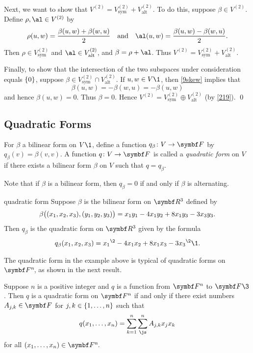 Next, we want to show that $V^{(2)} = V^{(2)}_{\text{sym}} + V^{(2)}_{\text{alt}}$. To do this, suppose $\beta \in V^{(2)}\!$. Define
$\rho, \al \in V^{(2)}$ by
\[
\rho(u,w) = \frac{ \beta(u,w) + \beta(w,u) }{2} \andd \al(u,w) = \frac{ \beta(u,w) - \beta(w,u) }{2}.
\]
Then $\rho \in V^{(2)}_{\text{sym}}$ and $\al \in V^{(2)}_{\text{alt}}$, and $\beta = \rho + \al$. Thus
$V^{(2)} = V^{(2)}_{\text{sym}} + V^{(2)}_{\text{alt}}$.

Finally, to show that the intersection of the two subspaces under consideration equals $\br{0}$, suppose
$\beta \in V^{(2)}_{\text{sym}} \cap V^{(2)}_{\text{alt}}$. If  $u, w \in V\1$, then \ref{9skew} implies that
\[
\beta(u,w) = -\beta(w, u) = -\beta(u,w)
\]
and hence $\beta(u, w) = 0$. Thus $\beta = 0$. Hence $V^{(2)} = V^{(2)}_{\text{sym}} \oplus V^{(2)}_{\text{alt}}$ (by \ref{219}).
\qed

\pagebreak[3]

\subsection{Quadratic Forms}

 {For $\beta$ a bilinear form on $V\1$, define a function $\fun {q_\beta} V {\F{}}$ by
$q_\beta(v) = \beta(v, v)$.
A function $\fun q V {\F{}}$ is called a \emph{quadratic form} on $V$ if there exists a bilinear form $\beta$ on $V$ such that
$q = q_\beta$.}

  Note that if $\beta$ is a bilinear form, then $q_\beta = 0$ if and only if $\beta$ is alternating.

\begin{example}[9quad]{quadratic form}
 Suppose $\beta$ is the bilinear form on $\R3$ defined by
 \[
 \beta\paren[\big]{(x_1, x_2,x_3), (y_1, y_2, y_3)} =  x_1 y_1 - 4x_1 y_2  + 8x_1 y_3 - 3x_3 y_3.
 \]
 Then $q_\beta$ is the quadratic form on $\R3$ given by the formula
 \[
 q_\beta(x_1, x_2, x_3) = {x_1}^{\2} - 4 x_1 x_2 +8 x_1 x_3 - 3{x_3}^{\2}\1.
 \]
 \exampledisplayend
 \vspace{.02in} %
 \end{example}

 The quadratic form in the example above is typical of quadratic forms on $\FF n$, as shown in the next result.

 {Suppose $n$ is a positive integer and $q$ is a function from $\F n$ to $\F{}\3$. Then $q$ is a quadratic form on $\F n$ if and only if there exist numbers $A_{j,k} \in \F{}$ for $j, k \in \br{ 1, \ldots, n} $ such that
 \vspace{-.1in} %
 \[
 q(x_1, \ldots, x_n) = \sum_{k=1}^n \sum_{\js}^n A_{j,k} x_j x_k
 \]
  for all $(x_1, \ldots, x_n) \in \FF n$.}

